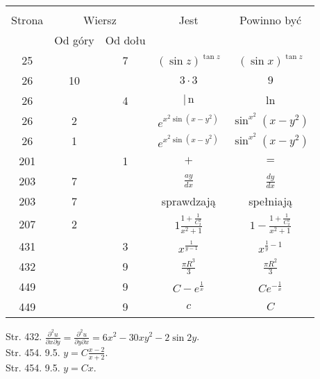 \documentclass[a4paper,11pt]{article}
\numberwithin{equation}{section}
\begin{document}


\begin{center}

  \begin{tabular}{|c|c|c|c|c|}
    \hline
    & \multicolumn{2}{c|}{} & & \\
    Strona & \multicolumn{2}{c|}{Wiersz} & Jest
                              & Powinno być \\ \cline{2-3}
    & Od góry & Od dołu & & \\
    \hline
    25  & &  7 & $( \sin z )^{ \tan z }$ & $( \sin x )^{ \tan z }$ \\
    26  & 10 & & $3 \cdot 3$ & $9$ \\
    26  & &  4 & $|\, \mathrm{n}$ & $\ln$ \\
    26  &  2 & & $e^{ x^{ 2 } \sin( x - y^{ 2 } ) }$
           & $\sin^{ x^{ 2 } }( x - y^{ 2 } )$ \\
    26  &  1 & & $e^{ x^{ 2 } \sin( x - y^{ 2 } ) }$
           & $\sin^{ x^{ 2 } }( x - y^{ 2 } )$ \\
    201 & &  1 & $+$ & $=$ \\
    203 &  7 & & $\frac{ a y }{ d x }$ & $\frac{ dy }{ dx }$ \\
    203 &  7 & & sprawdzają & spełniają \\
    207 &  2 & & $1 \frac{ 1 +
                 \tfrac{ 1 }{ C_{ 2 }^{ 2 } } } { x^{ 2 } + 1 }$
           & $1 - \frac{ 1 +
             \frac{ 1 }{ C_{ 2 }^{ 2 } } }{ x^{ 2 } + 1 }$ \\
    431 & &  3 & $x^{ \frac{ 1 }{ y - 1 } }$ & $x^{ \frac{ 1 }{ y } - 1 }$ \\
    432 & &  9 & $\frac{ \pi R^{ 3 } }{ 3 }$ & $\frac{ \pi R^{ 2 } }{ 3 }$ \\
    449 & &  9 & $C - e^{ \frac{ 1 }{ x } }$ & $C e^{ -\frac{ 1 }{ x } }$ \\
    449 & &  9 & $c$ & $C$ \\
    \hline
  \end{tabular}

\end{center}

\VerSpaceTwo


Str. 432.
$\frac{ \partial^{ 2 } u }{ \partial x \partial y }
= \frac{ \partial^{ 2 } u }{ \partial y \partial x }
= 6 x^{ 2 } - 30 x y^{ 2 } - 2 \sin 2y$. \\
Str. 454. 9.5. $y = C \frac{ x - 2 }{ x + 2 }$. \\
Str. 454. 9.5. $y = C x$.
\end{document}
